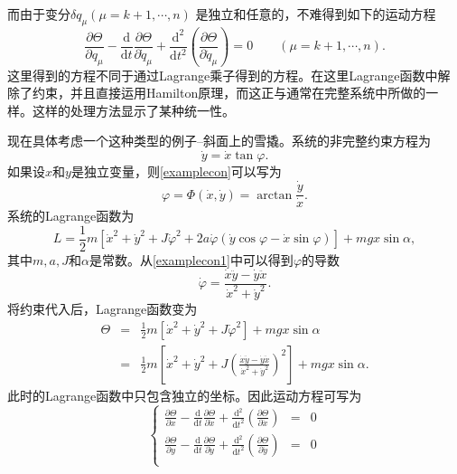 \documentclass[a4paper,UTF8,11pt,hyperref]{ctexart}
\newcommand{\mathd}{\mathrm{d}}
\begin{document}
而由于变分$\delta q_{\mu}  ( \mu = k + 1, \cdots, n)$ 是独立和任意的，不难得到如下的运动方程
\begin{equation}\label{modeleqn}
  \frac{\partial \Theta}{\partial q_{\mu}} - \frac{\mathd}{\mathd t}
  \frac{\partial \Theta}{\partial \dot{q}_{\mu}} +
  \frac{\mathd^2}{\mathd t^2} \left( \frac{\partial \Theta}{\partial
  \ddot{q}_{\mu}} \right) = 0 \hspace{2em} ( \mu = k + 1, \cdots, n) .
\end{equation}
这里得到的方程不同于通过Lagrange乘子得到的方程。在这里Lagrange函数中解除了约束，并且直接运用Hamilton原理，而这正与通常在完整系统中所做的一样。这样的处理方法显示了某种统一性。

现在具体考虑一个这种类型的例子--斜面上的雪撬\supercite{Neimark}。系统的非完整约束方程为
\begin{equation}
  \dot{y} = \dot{x} \tan \varphi . \label{examplecon}
\end{equation}
如果设$x$和$y$是独立变量，则\eqref{examplecon}可以写为
\begin{equation}
  \varphi = \Phi ( \dot{x}, \dot{y}) =  \arctan \frac{\dot{y}}{\dot{x}}.
  \label{examplecon1}
\end{equation}
系统的Lagrange函数为
\begin{equation}
  L = \frac{1}{2} m \left[ \dot{x}^2 + \dot{y}^2  + J \dot{\varphi}^2 + 2 a
  \dot{\varphi} ( \dot{y} \cos \varphi - \dot{x} \sin \varphi)\right] + m g x \sin\alpha,
\end{equation}
其中$m, a, J$和$\alpha$是常数。从\eqref{examplecon1}中可以得到$\varphi$的导数
\begin{equation}
  \dot{\varphi}=\frac{\dot{x} \ddot{y}-\dot{y} \ddot{x}}{\dot{x}^2+\dot{y}^2}.
\end{equation}
将约束代入后，Lagrange函数变为
\begin{equation}\label{examplelagrangian}
\begin{array}{rcl}
  \Theta&=&\frac{1}{2} m \left[ \dot{x}^2 + \dot{y}^2  + J \dot{\varphi}^2\right]+ m g x \sin\alpha\\[6pt]
        &=&\frac{1}{2} m \left[ \dot{x}^2 + \dot{y}^2  + J \left( \frac{\dot{x} \ddot{y}-\dot{y} \ddot{x}}{\dot{x}^2+\dot{y}^2}\right)^2\right]+ m g x \sin\alpha.
\end{array}
\end{equation}
此时的Lagrange函数中只包含独立的坐标。因此运动方程可写为
\begin{equation}\label{exampleeuler}
\left\{\begin{array}{rcl}
    \frac{\partial \Theta}{\partial x} - \frac{\mathd}{\mathd t}
  \frac{\partial \Theta}{\partial \dot{x}} +
  \frac{\mathd^2}{\mathd t^2} \left( \frac{\partial \Theta}{\partial
  \ddot{x}} \right)&=&0\\[6pt]
  \frac{\partial \Theta}{\partial y} - \frac{\mathd}{\mathd t}
  \frac{\partial \Theta}{\partial \dot{y}} +
  \frac{\mathd^2}{\mathd t^2} \left( \frac{\partial \Theta}{\partial
  \ddot{y}} \right)&=&0\\
  \end{array}\right.
\end{equation}
\end{document}
